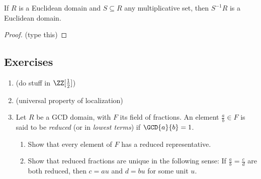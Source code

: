 \documentclass{article}
\begin{document}
\begin{prop}
If $R$ is a Euclidean domain and $S \subseteq R$ any multiplicative set, then $S^{-1}R$ is a Euclidean domain.
\end{prop}

\begin{proof}
(type this)
\end{proof}

\subsection*{Exercises}

\begin{enumerate}
\item (do stuff in $\ZZ[\frac{1}{2}]$)

\item (universal property of localization)

\item Let $R$ be a GCD domain, with $F$ its field of fractions. An element $\frac{a}{b} \in F$ is said to be \emph{reduced} (or in \emph{lowest terms}) if $\GCD{a}{b} = 1$.
\begin{enumerate}
\item Show that every element of $F$ has a reduced representative.
\item Show that reduced fractions are unique in the following sense: If $\frac{a}{b} = \frac{c}{d}$ are both reduced, then $c = au$ and $d = bu$ for some unit $u$.
\end{enumerate}
\end{enumerate}
\end{document}

